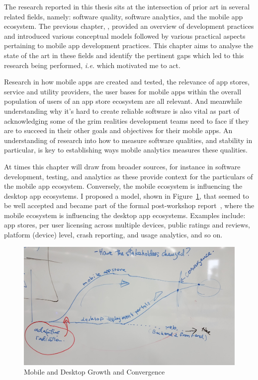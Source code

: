 The research reported in this thesis sits at the intersection of prior art in several related fields, namely: software quality, software analytics, and the mobile app ecosystem. %
The previous chapter, , provided an overview of development practices and introduced various conceptual models followed by various practical aspects pertaining to mobile app development practices.  
This chapter aims to analyse the state of the art in these fields and identify the pertinent gaps which led to this research being performed, \emph{i.e.} which motivated me to act.  

Research in how mobile apps are created and tested, the relevance of app stores, service and utility providers, the user bases for mobile apps within the overall population of users of an app store ecosystem are all relevant. And meanwhile understanding why it's hard to create reliable software is also vital as part of acknowledging some of the grim realities development teams need to face if they are to succeed in their other goals and objectives for their mobile apps. An understanding of research into how to measure software qualities, and stability in particular, is key to establishing ways mobile analytics measures these qualities. 

At times this chapter will draw from broader sources, for instance in software development, testing, and analytics as these provide context for the particulars of the mobile app ecosystem. Conversely, the mobile ecosystem is influencing the desktop app ecosystems. I proposed a model, shown in Figure~\ref{fig:my_shonan_hysteresis_sketch}, that seemed to be well accepted and became part of the formal post-workshop report~, where the mobile ecosystem is influencing the desktop app ecosystems. Examples include: app stores, per user licensing across multiple devices, public ratings and reviews, platform (device) level, crash reporting, and usage analytics, and so on.

\begin{figure}
    \centering
    \includegraphics[width=\linewidth]{images/nii-shonan-workshop-152/shonan_hysteresis_diagram_20191210_132528.jpg}
    \caption{Mobile and Desktop Growth and Convergence}
    \label{fig:my_shonan_hysteresis_sketch}
\end{figure}



